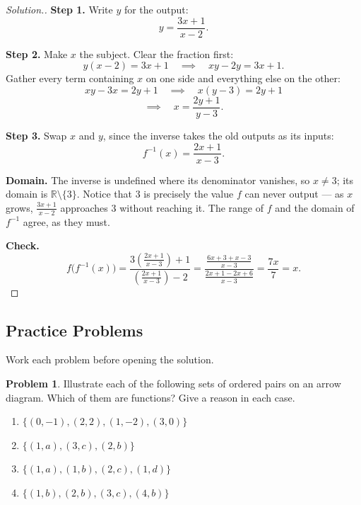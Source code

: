 \documentclass[11pt,a4paper]{article}
\theoremstyle{definition}
\newtheorem{problemx}{Problem}[section]
\newenvironment{problem}{\begin{problemx}}{\end{problemx}}
\newenvironment{solution}
  {\renewcommand{\qedsymbol}{}\begin{proof}[\textit{Solution}.]}
  {\end{proof}}
\begin{document}
\begin{solution}
\textbf{Step 1.} Write $y$ for the output:
$$y=\frac{3x+1}{x-2}.$$

\textbf{Step 2.} Make $x$ the subject. Clear the fraction first:
$$y(x-2)=3x+1\quad\implies\quad xy-2y=3x+1.$$
Gather every term containing $x$ on one side and everything else on the other:
$$xy-3x=2y+1\quad\implies\quad x(y-3)=2y+1$$
$$\implies\quad x=\frac{2y+1}{y-3}.$$

\textbf{Step 3.} Swap $x$ and $y$, since the inverse takes the old outputs as its
inputs:
$$f^{-1}(x)=\frac{2x+1}{x-3}.$$

\textbf{Domain.} The inverse is undefined where its denominator vanishes, so
$x\neq 3$; its domain is $\mathbb{R}\setminus\{3\}$. Notice that $3$ is precisely the
value $f$ can never output --- as $x$ grows, $\frac{3x+1}{x-2}$ approaches $3$ without
reaching it. The range of $f$ and the domain of $f^{-1}$ agree, as they must.

\textbf{Check.} $$f\big(f^{-1}(x)\big)
=\frac{3\left(\frac{2x+1}{x-3}\right)+1}{\left(\frac{2x+1}{x-3}\right)-2}
=\frac{\frac{6x+3+x-3}{x-3}}{\frac{2x+1-2x+6}{x-3}}
=\frac{7x}{7}=x. $$
\end{solution}


\subsection{Practice Problems}

Work each problem before opening the solution.

\begin{problem}
Illustrate each of the following sets of ordered pairs on an arrow diagram. Which of
them are functions? Give a reason in each case.
\begin{enumerate}
\item[(i).] $\{(0,-1),(2,2),(1,-2),(3,0)\}$
\item[(ii).] $\{(1,a),(3,c),(2,b)\}$
\item[(iii).] $\{(1,a),(1,b),(2,c),(1,d)\}$
\item[(iv).] $\{(1,b),(2,b),(3,c),(4,b)\}$
\end{enumerate}
\end{problem}
\end{document}
